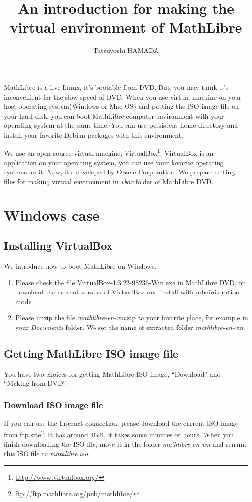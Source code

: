 \documentclass[a4]{article}
\title{An introduction for making the virtual environment of MathLibre}
\author{Tatsuyoshi HAMADA}
\newcommand{\vboxwin}{VirtualBox-4.3.22-98236-Win.exe}
\newcommand{\vm}{{\em mathlibre-en-vm}}
\begin{document}
\maketitle
MathLibre is a live Linux, it's bootable from DVD.
But, you may think it's inconvenient for the slow speed of DVD.
When you use virtual machine on your host operating system(Windows or Mac OS) and
putting the ISO image file on your hard disk,
you can boot MathLibre computer environment with your operating system
at the same time.
You can use persistent home directory and install your favorite Debian
packages with this environment.

We use an open source virtual machine,
VirtualBox\footnote{\url{http://www.virtualbox.org/}}.
VirtualBox is an application on your operating system,
you can use your favorite operating systems on it.
Now, it's developed by Oracle Corporation.
We prepare setting files for making virtual environment 
in {\em vbox} folder of MathLibre DVD.

\section{Windows case}
\subsection{Installing VirtualBox}
We introduce how to boot MathLibre on Windows.
\begin{enumerate}
 \item Please check the file \vboxwin{} in MathLibre DVD, or download the
       current version of VirtualBox and install with administration mode.
 \item Please unzip the file \vm.zip{} to your favorite place, for example
       in your {\em Documents} folder. We set the name of extracted folder \vm{}.
\end{enumerate}

\subsection{Getting MathLibre ISO image file}
You have two choices for getting MathLibre ISO image,
``Download'' and ``Making from DVD''.

\subsubsection{Download ISO image file}
If you can use the Internet connection,
please download the current ISO image from ftp site\footnote{\url{ftp://ftp.mathlibre.org/pub/mathlibre/}}.
It has around 4GB, it takes some minutes or hours.
When you finish downloading the ISO file,
move it in the folder \vm{} and rename this ISO file to
{\em mathlibre.iso}. 
\end{document}
